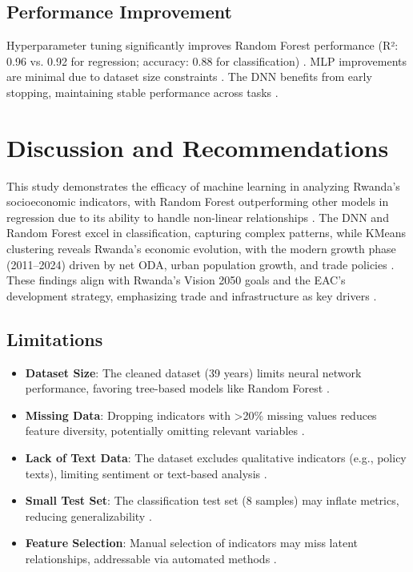 \documentclass[12pt]{article}
\begin{document}
	\subsection{Performance Improvement}
	Hyperparameter tuning significantly improves Random Forest performance (R²: 0.96 vs. 0.92 for regression; accuracy: 0.88 for classification) \citep{breiman}. MLP improvements are minimal due to dataset size constraints \citep{goodfellow}. The DNN benefits from early stopping, maintaining stable performance across tasks \citep{tensorflow}.
	\section{Discussion and Recommendations}
	This study demonstrates the efficacy of machine learning in analyzing Rwanda's socioeconomic indicators, with Random Forest outperforming other models in regression due to its ability to handle non-linear relationships \citep{breiman}. The DNN and Random Forest excel in classification, capturing complex patterns, while KMeans clustering reveals Rwanda's economic evolution, with the modern growth phase (2011–2024) driven by net ODA, urban population growth, and trade policies \citep{rwanda_vision, eac}. These findings align with Rwanda's Vision 2050 goals and the EAC's development strategy, emphasizing trade and infrastructure as key drivers \citep{un_sdg}.
	
	\subsection{Limitations}
	\begin{itemize}
		\item \textbf{Dataset Size}: The cleaned dataset (39 years) limits neural network performance, favoring tree-based models like Random Forest \citep{goodfellow}.
		\item \textbf{Missing Data}: Dropping indicators with >20\% missing values reduces feature diversity, potentially omitting relevant variables \citep{imputation}.
		\item \textbf{Lack of Text Data}: The dataset excludes qualitative indicators (e.g., policy texts), limiting sentiment or text-based analysis \citep{nlp_book}.
		\item \textbf{Small Test Set}: The classification test set (8 samples) may inflate metrics, reducing generalizability \citep{hastie}.
		\item \textbf{Feature Selection}: Manual selection of indicators may miss latent relationships, addressable via automated methods \citep{feature_selection}.
	\end{itemize}
	
\end{document}
